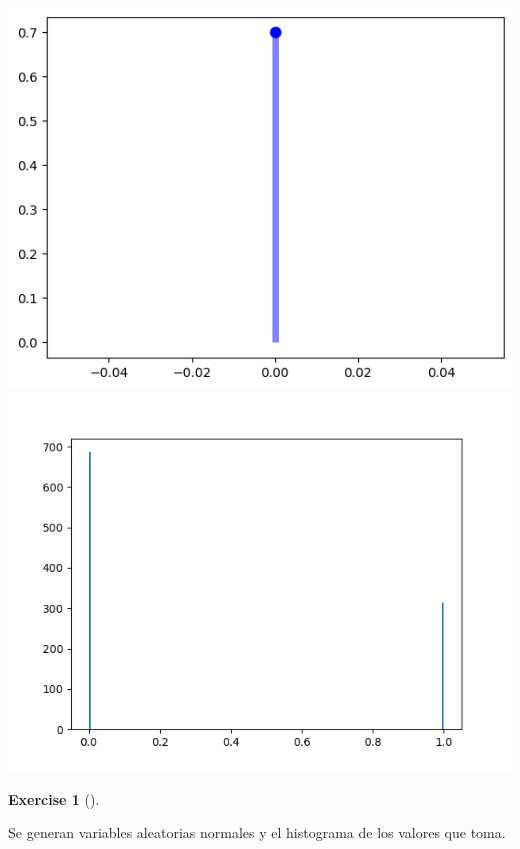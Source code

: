 \documentclass[
  letterpaper,
  DIV=11,
  numbers=noendperiod]{scrreprt}
\theoremstyle{plain}
\theoremstyle{definition}
\newtheorem{exercise}{Exercise}[chapter]
\theoremstyle{remark}
\begin{document}
\includegraphics{figura1.png} \includegraphics{F2.png}

\begin{exercise}[]\protect\hypertarget{exr-2}{}\label{exr-2}

Se generan variables aleatorias normales y el histograma de los valores
que toma.

\end{exercise}
\end{document}
